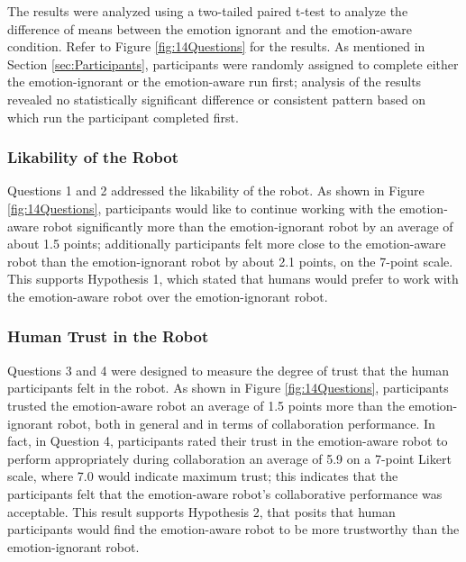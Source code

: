 \documentclass[12pt]{report}
\begin{document}
The results were analyzed using a two-tailed paired t-test to analyze the
difference of means between the emotion ignorant and the emotion-aware
condition. Refer to Figure \ref{fig:14Questions} for the results. As mentioned
in Section \ref{sec:Participants}, participants were randomly assigned to complete
either the emotion-ignorant or the emotion-aware run first; analysis of the
results revealed no statistically significant difference or consistent pattern
based on which run the participant completed first.

\subsubsection{Likability of the Robot}
\label{sec:Likability}
Questions 1 and 2 addressed the likability of the robot. As shown in Figure
\ref{fig:14Questions}, participants would like to continue working with the emotion-aware
robot significantly more than the emotion-ignorant robot by an average of about 1.5
points; additionally participants felt more close to the emotion-aware robot
than the emotion-ignorant robot by about 2.1 points, on the 7-point scale. This
supports Hypothesis 1, which stated that humans would prefer to work with the
emotion-aware robot over the emotion-ignorant robot.

\subsubsection{Human Trust in the Robot}
\label{sec:Trust}
Questions 3 and 4 were designed to measure the degree of trust that the human
participants felt in the robot. As shown in Figure \ref{fig:14Questions},
participants trusted the emotion-aware robot an average of 1.5 points more than
the emotion-ignorant robot, both in general and in terms of collaboration
performance. In fact, in Question 4, participants rated their trust in the
emotion-aware robot to perform appropriately during collaboration an average of
5.9 on a 7-point Likert scale, where 7.0 would indicate maximum trust; this
indicates that the participants felt that the emotion-aware robot's
collaborative performance was acceptable. This result supports Hypothesis 2,
that posits that human participants would find the emotion-aware robot to be
more trustworthy than the emotion-ignorant robot.
\end{document}
